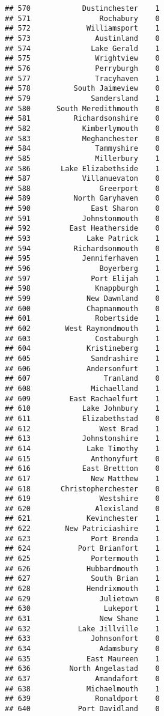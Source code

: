 \documentclass[
]{article}
\begin{document}
\begin{verbatim}
## 570            Dustinchester    1
## 571                Rochabury    0
## 572             Williamsport    1
## 573               Austinland    0
## 574              Lake Gerald    1
## 575               Wrightview    0
## 576               Perryburgh    0
## 577               Tracyhaven    1
## 578          South Jaimeview    0
## 579              Sandersland    1
## 580      South Meredithmouth    0
## 581          Richardsonshire    0
## 582            Kimberlymouth    0
## 583            Meghanchester    0
## 584               Tammyshire    0
## 585               Millerbury    1
## 586       Lake Elizabethside    1
## 587            Villanuevaton    0
## 588                Greerport    0
## 589          North Garyhaven    0
## 590              East Sharon    0
## 591            Johnstonmouth    0
## 592         East Heatherside    0
## 593             Lake Patrick    1
## 594          Richardsonmouth    0
## 595            Jenniferhaven    1
## 596                Boyerberg    1
## 597              Port Elijah    1
## 598               Knappburgh    1
## 599             New Dawnland    0
## 600             Chapmanmouth    0
## 601               Robertside    1
## 602        West Raymondmouth    1
## 603               Costaburgh    1
## 604             Kristineberg    1
## 605              Sandrashire    1
## 606             Andersonfurt    1
## 607                 Tranland    0
## 608              Michaelland    1
## 609         East Rachaelfurt    1
## 610            Lake Johnbury    1
## 611            Elizabethstad    0
## 612                West Brad    1
## 613            Johnstonshire    1
## 614             Lake Timothy    1
## 615              Anthonyfurt    0
## 616            East Brettton    0
## 617              New Matthew    1
## 618       Christopherchester    0
## 619                Westshire    0
## 620               Alexisland    0
## 621             Kevinchester    1
## 622        New Patriciashire    1
## 623              Port Brenda    1
## 624           Port Brianfort    1
## 625              Portermouth    1
## 626             Hubbardmouth    1
## 627              South Brian    1
## 628             Hendrixmouth    1
## 629                Julietown    0
## 630                 Lukeport    1
## 631                New Shane    1
## 632           Lake Jillville    1
## 633              Johnsonfort    0
## 634                Adamsbury    0
## 635             East Maureen    1
## 636         North Angelastad    0
## 637               Amandafort    0
## 638             Michaelmouth    1
## 639               Ronaldport    0
## 640           Port Davidland    0

\end{verbatim}
\end{document}
